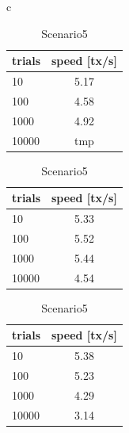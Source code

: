 \documentclass[a4paper, oneside]{discothesis}
\begin{document}
\begin{table}[t]
    \begin{center}
        \begin{tabular}{c}

            \begin{minipage}{0.33\hsize}
                \begin{center}
                    \caption{Scenario3}
                    \label{tbl:scenario3}
                    \begin{tabular}{|l|c|} \hline
                        trials & speed [tx/s]\\ \hline \hline
                        10 & 5.17 \\
                        100 & 4.58 \\
                        1000 & 4.92 \\
                        10000 & tmp \\ \hline
                    \end{tabular}
                \end{center}
            \end{minipage}

            \begin{minipage}{0.33\hsize}
                \begin{center}
                    \caption{Scenario4}
                    \label{tbl:scenario4}
                    \begin{tabular}{|l|c|} \hline
                        trials & speed [tx/s]\\ \hline \hline
                        10 & 5.33 \\
                        100 & 5.52 \\
                        1000 & 5.44 \\
                        10000 & 4.54 \\ \hline
                    \end{tabular}
                \end{center}
            \end{minipage}

            \begin{minipage}{0.33\hsize}
                \begin{center}
                    \caption{Scenario5}
                    \label{tbl:scenario5}
                    \begin{tabular}{|l|c|} \hline
                        trials & speed [tx/s]\\ \hline \hline
                        10 &  5.38 \\
                        100 & 5.23 \\
                        1000 & 4.29 \\
                        10000 & 3.14 \\ \hline
                    \end{tabular}
                \end{center}
            \end{minipage}


\end{tabular}
\end{center}
\end{table}
\end{document}
